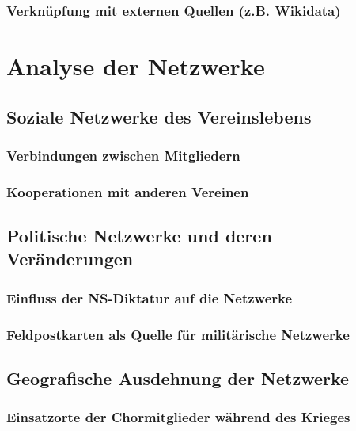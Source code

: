 \documentclass[12pt, a4paper, ngerman, bidi=default]{article}
\begin{document}
      \subsubsection{Verknüpfung mit externen Quellen (z.B. Wikidata)}

    \newpage
\section{Analyse der Netzwerke}
  \subsection{Soziale Netzwerke des Vereinslebens}
    \subsubsection{Verbindungen zwischen Mitgliedern}
    \subsubsection{ Kooperationen mit anderen Vereinen}
\subsection{ Politische Netzwerke und deren Veränderungen}
    \subsubsection{Einfluss der NS-Diktatur auf die Netzwerke}
    \subsubsection{Feldpostkarten als Quelle für militärische Netzwerke}
    
 \subsection{ Geografische Ausdehnung der Netzwerke}
  \subsubsection{Einsatzorte der Chormitglieder während des Krieges}
\end{document}

